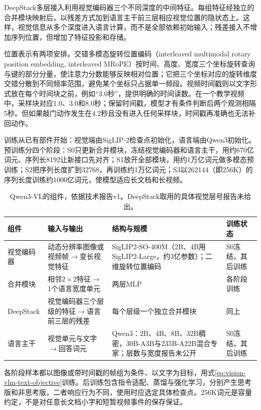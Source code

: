 DeepStack多层接入利用视觉编码器三个不同深度的中间特征。每组特征经独立的合并模块映射后，以残差方式加到语言主干前三层相应视觉位置的隐状态上。这样，视觉信息从多个深度进入语言计算，而不是全部依赖初始输入；残差接入不增加序列位置，但增加了特征投影和存储。

位置表示有两项安排。交错多模态旋转位置编码（interleaved multimodal rotary position embedding, interleaved MRoPE）按时间、高度、宽度三个坐标旋转查询与键的部分分量，使注意力分数能够反映相对位置；它把三个坐标对应的旋转维度交错分散到不同频率范围，避免某个坐标只占据单一频段。视频时间戳则以文字形式放在每个时间块之前，例如“3.0秒”，提供明确的时间读数。在一个教学视频中，采样块对应1.0、3.0和8.0秒；保留时间戳，模型才有条件判断后两个观测相隔5秒。但如果敲门动作发生在4.2秒且没有进入任何采样块，时间戳再准确也无法补回动作。

训练从已有部件开始：视觉端由SigLIP-2检查点初始化，语言端由Qwen3初始化。预训练分四个阶段：S0只更新合并模块，冻结视觉编码器和语言主干，用约670亿词元、序列长8192让新接口先对齐；S1放开全部模块，用约1万亿词元做多模态预训练；S2把序列长度扩到32768，再训练约1万亿词元；S3以262144（即256K）的序列长度训练约1000亿词元，使模型适应长文档和长视频。

\begin{table}[htbp]
  \centering
  \small
  \begin{tabularx}{\linewidth}{@{}p{14mm}XXp{14mm}@{}}
    \toprule
    组件 & 输入与输出 & 结构与规模 & 训练状态\\
    \midrule
    视觉编码器 & 动态分辨率图像或视频帧$\to$变长视觉特征 & SigLIP2-SO-400M（2B、4B用SigLIP2-Large，约3亿参数）；二维旋转位置编码 & S0冻结，其后训练\\
    合并模块 & 相邻$2\times2$特征$\to$1个语言宽度单元 & 两层MLP & 各阶段训练\\
    DeepStack & 视觉编码器三个层级的特征$\to$语言前三层的残差 & 每个层级一个独立合并模块 & 同上\\
    语言主干 & 视觉单元与文字$\to$回答词元 & Qwen3：2B、4B、8B、32B稠密，30B-A3B与235B-A22B混合专家；层数与宽度报告未公开 & S0冻结，其后训练\\
    \bottomrule
  \end{tabularx}
  \caption{Qwen3-VL的组件，依据技术报告v1。DeepStack取用的具体视觉层号报告未给出。}
  \label{tab:vision-models-qwen3vl-config}
\end{table}各阶段样本都以图像或带时间戳的帧组为条件、以文字为目标，用式\eqref{eq:vision-vlm-text-objective}训练。后训练包含指令适配、蒸馏与强化学习，分别产生思考版和非思考版，二者响应行为不同，使用时应选定具体检查点。256K词元是容量约定，不是对任意长文档小字和短暂视频事件的保存保证。

